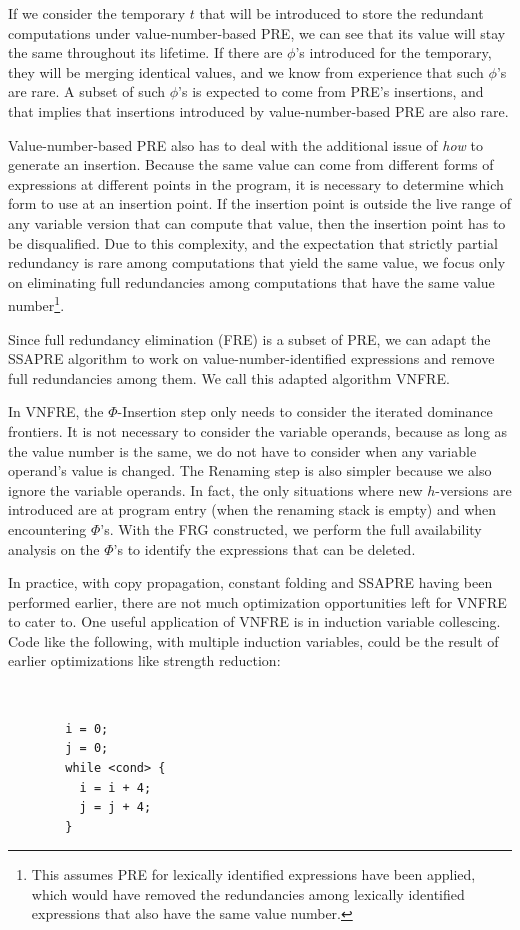 If we consider the temporary $t$ that will be introduced to store the redundant
computations under value-number-based PRE, we can see that its value will
stay the same throughout its lifetime.  If there are $\phi$'s introduced for
the temporary, they will be merging identical values, and we know from
experience that such $\phi$'s are rare.  A subset of such $\phi$'s is expected 
to come from PRE's insertions, and that implies that insertions
introduced by value-number-based PRE are also rare.

Value-number-based PRE also has to deal with the additional issue of \emph{how}
to generate an insertion.  Because the same value can come from different forms
of expressions at different points in the program, it is necessary to determine
which form to use at an insertion point.  If the insertion point is outside 
the live range of any variable version that can compute that value, then the
insertion point has to be disqualified.  Due to this complexity, and the
expectation that strictly partial redundancy is rare among computations
that yield the same value, we focus only on eliminating full redundancies
among computations that have the same value number\footnote{This assumes
PRE for lexically identified expressions have been applied, which would have
removed the redundancies among lexically identified expressions that also
have the same value number.}.

Since full redundancy elimination (FRE) is a subset of PRE, we can adapt the
SSAPRE algorithm to work on value-number-identified expressions and remove
full redundancies among them.  We call this adapted algorithm VNFRE.

In VNFRE, the $\Phi$-Insertion step only needs to consider the iterated
dominance frontiers.  It is not necessary to consider the variable operands,
because as long as the value number is the same, we do not have to consider
when any variable operand's value is changed. The Renaming step is also simpler
because we also ignore the variable operands.  In fact, the only situations 
where new $h$-versions are introduced are at program entry (when the renaming 
stack is empty) and when encountering $\Phi$'s.  With the FRG constructed,
we perform the full availability analysis on the $\Phi$'s to identify
the expressions that can be deleted.

In practice, with copy propagation, constant folding and SSAPRE having been 
performed earlier, there are not much optimization opportunities left 
for VNFRE to cater to.  One useful application of VNFRE is in induction
variable collescing.  Code like the following, with multiple induction
variables, could be the result of
earlier optimizations like strength reduction:
{\tt
\begin{verbatim}
        i = 0;
        j = 0;
        while <cond> {
          i = i + 4;
          j = j + 4;
        }
\end{verbatim}
}

